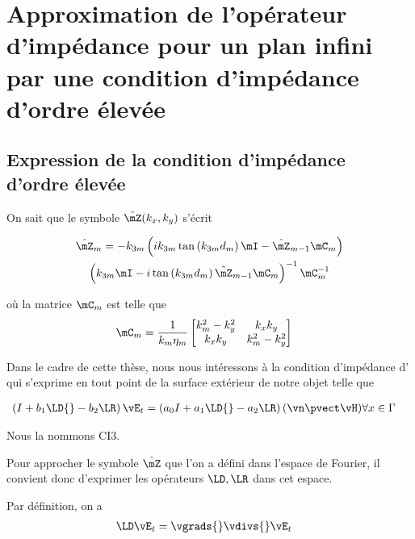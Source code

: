 \section{Approximation de l'opérateur d'impédance pour un plan infini par une condition d'impédance d'ordre élevée}

  \subsection{Expression de la condition d'impédance d'ordre élevée}

    On sait que le symbole \(\hat{\mZ}(k_x,k_y)\) s'écrit

    \begin{multline}
        \hat \mZ_m = -k_{3m}
        \left(ik_{3m}\tan\left(k_{3m}d_m\right)\mI - \hat \mZ_{m-1}\mC_m\right) \\
        \left(k_{3m}\mI - i\tan\left(k_{3m}d_m\right)\hat \mZ_{m-1}\mC_m\right)^{-1}
        \mC_m^{-1}
    \end{multline}

    où la matrice \(\mC_m\) est telle que
    \begin{align}
       \mC_m &= \frac{1}{k_m\eta_m}
        \begin{bmatrix}
            k_m^2 - k_y^2 & k_xk_y\\
            k_xk_y & k_m^2 - k_y^2
        \end{bmatrix}
    \end{align}

    Dans le cadre de cette thèse, nous nous intéressons à la condition d'impédance d'\cite{aubakirov_electromagnetic_2014} qui s'exprime en tout point de la surface extérieur de notre objet telle que

    \begin{align}
        \left(I + b_1 \LD{} -b_2 \LR \right)\vE_t = \left(a_0 I + a_1 \LD{} - a_2 \LR \right)(\vn \pvect \vH) & \forall x \in \Gamma
    \end{align}

    Nous la nommons CI3.

    Pour approcher le symbole \(\hat{\mZ}\) que l'on a défini dans l'espace de Fourier, il convient donc d'exprimer les opérateurs \(\LD, \LR\) dans cet espace.


    Par définition, on a
    \begin{align}
      \LD \vE_t & = \vgrads{} \vdivs{} \vE_t
    \end{align}

